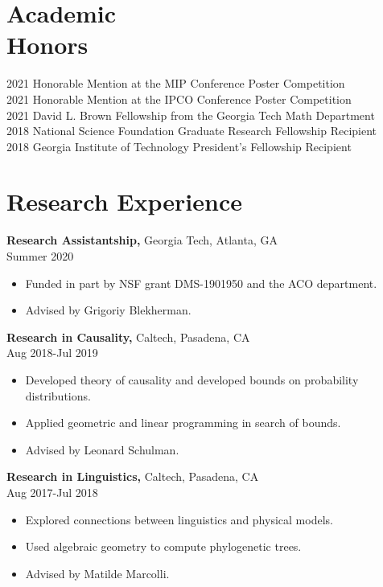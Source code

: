 \documentclass[margin]{res}
\begin{document}
\begin{resume}
\section{Academic \\ Honors} 
2021 Honorable Mention at the MIP Conference Poster Competition\\
2021 Honorable Mention at the IPCO Conference Poster Competition\\
2021 David L. Brown Fellowship from the Georgia Tech Math Department\\
2018 National Science Foundation Graduate Research Fellowship Recipient\\
2018 Georgia Institute of Technology President's Fellowship Recipient

\section{Research Experience}
{\bf Research Assistantship,} Georgia Tech, Atlanta, GA \\ Summer 2020
\begin{itemize} \itemsep -2pt %
\item Funded in part by NSF grant DMS-1901950 and the ACO department.
\item Advised by Grigoriy Blekherman.
\end{itemize}
 
{\bf Research in Causality,} Caltech, Pasadena, CA \\ Aug 2018-Jul 2019
\begin{itemize} \itemsep -2pt %
\item Developed theory of causality and developed bounds on probability distributions.
\item Applied geometric and linear programming in search of bounds.
\item Advised by Leonard Schulman.
\end{itemize}
 
{\bf Research in Linguistics,} Caltech, Pasadena, CA \\ Aug 2017-Jul 2018
\begin{itemize} \itemsep -2pt %
\item Explored connections between linguistics and physical models.
\item Used algebraic geometry to compute phylogenetic trees.
\item Advised by Matilde Marcolli.
\end{itemize}


\end{resume}
\end{document}
